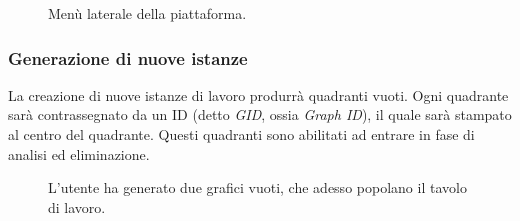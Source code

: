 \begin{figure}[ht!]
    \centering
    \caption{Menù laterale della piattaforma.}
    \label{fig:esempio}
\end{figure}

\newpage

\subsubsection{Generazione di nuove istanze}

La creazione di nuove istanze di lavoro produrrà quadranti vuoti. Ogni quadrante sarà contrassegnato da un ID (detto \textit{GID}, ossia \textit{Graph ID}), il quale sarà stampato al centro del quadrante. Questi quadranti sono abilitati ad entrare in fase di analisi ed eliminazione.

\begin{figure}[ht!]
    \centering
    \caption{L'utente ha generato due grafici vuoti, che adesso popolano il tavolo di lavoro.}
    \label{fig:esempio}
\end{figure}